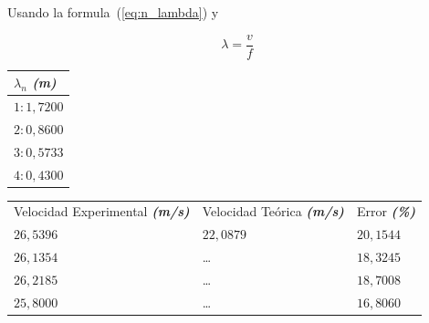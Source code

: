 \documentclass[twocolumn, 12pt]{article}
\newcommand{\bolditalic}[1]{\textbf{\textit{#1}}}
\begin{document}
Usando la formula~(\ref{eq:n_lambda}) y

\begin{equation*}
    \lambda = \frac{v}{f}
\end{equation*}

\begin{table}[H]
    \begin{tabularx}{.9\linewidth}{|>{\centering\arraybackslash}X|}
        \hline
        $\lambda_{n}$ \bolditalic{(m)} \\\hline
        $1: 1,7200$                    \\\hline
        $2: 0,8600$                    \\\hline
        $3: 0,5733$                    \\\hline
        $4: 0,4300$                    \\\hline
    \end{tabularx}
\end{table}

\begin{table}[H]
    \begin{tabularx}{0.9\linewidth}{|>{\centering\arraybackslash}X|>{\centering\arraybackslash}X|>{\centering\arraybackslash}X|}
        \multicolumn{3}{c}{\large $M_{1}$}                                                                         \\\hline
        Velocidad Experimental \bolditalic{(m/s)} & Velocidad Teórica \bolditalic{(m/s)} & Error \bolditalic{(\%)} \\\hline
        $26,5396$                                 & $22,0879$                            & $20,1544$               \\\hline
        $26,1354$                                 & \dots                                & $18,3245$               \\\hline
        $26,2185$                                 & \dots                                & $18,7008$               \\\hline
        $25,8000$                                 & \dots                                & $16,8060$               \\\hline
    \end{tabularx}
\end{table}

\vspace{-.5cm}
\end{document}
